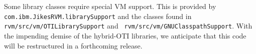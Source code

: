  Some library classes require special VM support.  This is provided by
{\tt com.ibm.JikesRVM.librarySupport} and the classes found in
{\tt rvm/src/vm/OTILibrarySupport} and {\tt
rvm/src/vm/GNUClasspathSupport}.  With the impending demise of the
hybrid-OTI libraries, we anticipate that this code will be
restructured in a forthcoming release.

\JavaTMFooter
\JikesTMFooter
